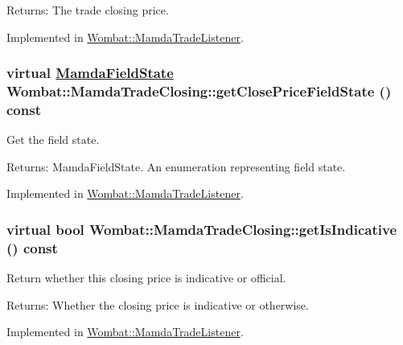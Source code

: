 \begin{Desc}
\item[Returns:]The trade closing price. \end{Desc}


Implemented in \hyperlink{classWombat_1_1MamdaTradeListener_cdd9837ec44cbdfb5bd15b563d99ba7b}{Wombat::Mamda\-Trade\-Listener}.\hypertarget{classWombat_1_1MamdaTradeClosing_9038a566c4c213c24f304cbd884f2791}{
\subsubsection[getClosePriceFieldState]{\setlength{\rightskip}{0pt plus 5cm}virtual \hyperlink{namespaceWombat_93aac974f2ab713554fd12a1fa3b7d2a}{Mamda\-Field\-State} Wombat::Mamda\-Trade\-Closing::get\-Close\-Price\-Field\-State () const}}
\label{classWombat_1_1MamdaTradeClosing_9038a566c4c213c24f304cbd884f2791}


Get the field state. 

\begin{Desc}
\item[Returns:]Mamda\-Field\-State. An enumeration representing field state. \end{Desc}


Implemented in \hyperlink{classWombat_1_1MamdaTradeListener_47222f2a6f39a3fcca3128317718cc79}{Wombat::Mamda\-Trade\-Listener}.\hypertarget{classWombat_1_1MamdaTradeClosing_1cc09c62280886142698dcafaef84660}{
\subsubsection[getIsIndicative]{\setlength{\rightskip}{0pt plus 5cm}virtual bool Wombat::Mamda\-Trade\-Closing::get\-Is\-Indicative () const}}
\label{classWombat_1_1MamdaTradeClosing_1cc09c62280886142698dcafaef84660}


Return whether this closing price is indicative or official. 

\begin{Desc}
\item[Returns:]Whether the closing price is indicative or otherwise. \end{Desc}


Implemented in \hyperlink{classWombat_1_1MamdaTradeListener_4fdf4fec41a6f66b7acd2be40a7c4e03}{Wombat::Mamda\-Trade\-Listener}.